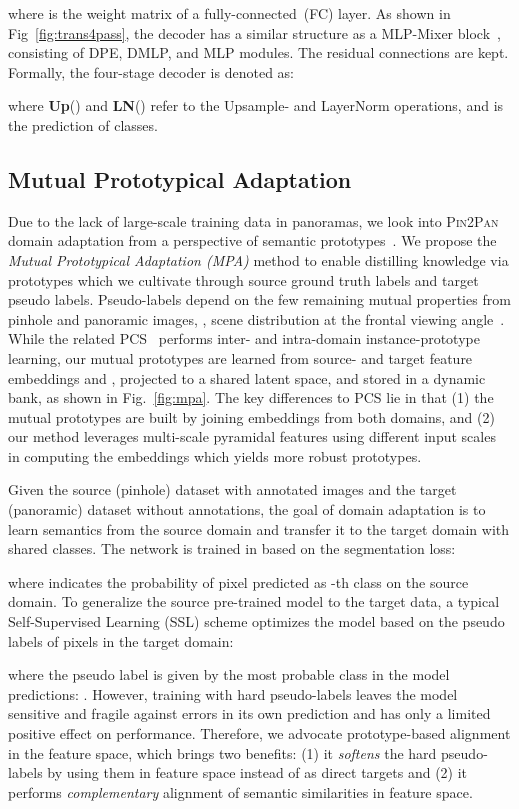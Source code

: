 \documentclass[final]{cvpr}
\begin{document}
where  is the weight matrix of a fully-connected~(FC) layer. 
As shown in Fig~\ref{fig:trans4pass}, the decoder has a similar structure as a MLP-Mixer block~\cite{mlp_mixer}, consisting of DPE, DMLP, and MLP modules. The residual connections are kept. Formally, the four-stage decoder is denoted as:

where \textbf{Up}() and \textbf{LN}() refer to the Upsample- and LayerNorm operations, and  is the prediction of  classes.


\subsection{Mutual Prototypical Adaptation}
\label{sec:mpa}
Due to the lack of large-scale training data in panoramas, we look into \textsc{Pin2Pan} domain adaptation from a perspective of semantic prototypes~\cite{proda}.
We propose the \emph{Mutual Prototypical Adaptation (MPA)} method to enable distilling knowledge via prototypes which we cultivate through source ground truth labels and target pseudo labels.
Pseudo-labels depend on the few remaining mutual properties from pinhole and panoramic images, \eg, scene distribution at the frontal viewing angle~\cite{hanet,omnirange}.
While the related PCS~\cite{yue2021pcs} performs inter- and intra-domain instance-prototype learning, our mutual prototypes are learned from source- and target feature embeddings  and , projected to a shared latent space, and stored in a dynamic bank, as shown in Fig.~\ref{fig:mpa}. 
The key differences to PCS lie in that (1) the mutual prototypes are built by joining embeddings from both domains, and (2) our method leverages multi-scale pyramidal features using different input scales in computing the embeddings which yields more robust prototypes.

Given the source (pinhole) dataset with annotated images  and the target (panoramic) dataset  without annotations, the goal of domain adaptation is to learn semantics from the source domain and transfer it to the target domain with  shared classes. The network is trained in  based on the segmentation loss:

where  indicates the probability of pixel  predicted as -th class on the source domain.
To generalize the source pre-trained model to the target data, a typical Self-Supervised Learning (SSL) scheme optimizes the model based on the pseudo labels  of pixels  in the target domain: 

where the pseudo label is given by the most probable class in the model predictions:
.
However, training with hard pseudo-labels leaves the model sensitive and fragile against errors in its own prediction and has only a limited positive effect on performance. Therefore, we advocate prototype-based alignment in the feature space, which brings two benefits: (1) it \emph{softens} the hard pseudo-labels by using them in feature space instead of as direct targets and (2) it performs \emph{complementary} alignment of semantic similarities in feature space.
\end{document}
